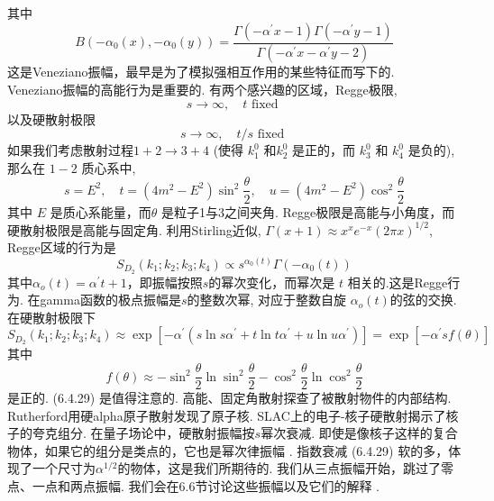 其中
\begin{equation}
	B\left(-\alpha_{0}(x),-\alpha_{0}(y)\right)=\frac{\Gamma\left(-\alpha^{\prime} x-1\right) \Gamma\left(-\alpha^{\prime} y-1\right)}{\Gamma\left(-\alpha^{\prime} x-\alpha^{\prime} y-2\right)}
\end{equation}
这是Veneziano振幅，最早是为了模拟强相互作用的某些特征而写下的.\\
Veneziano振幅的高能行为是重要的. 有两个感兴趣的区域，Regge极限,
\begin{equation}
	s \rightarrow \infty, \quad t \text { fixed }
\end{equation}
以及硬散射极限
\begin{equation}
	s \rightarrow \infty, \quad t / s \text { fixed }
\end{equation}
如果我们考虑散射过程$1+2 \rightarrow 3+4$ (使得 $k_{1}^{0}$ 和$k_{2}^{0}$ 是正的，而 $k_{3}^{0}$ 和 $k_{4}^{0}$ 是负的), 那么在 $1-2$ 质心系中,
\begin{equation}
	s=E^{2}, \quad t=\left(4 m^{2}-E^{2}\right) \sin ^{2} \frac{\theta}{2}, \quad u=\left(4 m^{2}-E^{2}\right) \cos ^{2} \frac{\theta}{2}
\end{equation}
其中 $E$ 是质心系能量，而$\theta$ 是粒子1与3之间夹角. Regge极限是高能与小角度，而硬散射极限是高能与固定角. 利用Stirling近似, $\Gamma(x+1) \approx x^{x} e^{-x}(2 \pi x)^{1 / 2}$, Regge区域的行为是
\begin{equation}
	S_{D_{2}}\left(k_{1} ; k_{2} ; k_{3} ; k_{4}\right) \propto s^{\alpha_{0}(t)} \Gamma\left(-\alpha_{0}(t)\right)
\end{equation}
其中$\alpha_{o}(t)=\alpha^{\prime} t+1 $，即振幅按照$s$的幂次变化，而幂次是 $t$ 相关的.这是Regge行为. 在gamma函数的极点振幅是$s$的整数次幂, 对应于整数自旋 $\alpha_{o}(t)$的弦的交换.\\
在硬散射极限下
\begin{equation}
	S_{D_{2}}\left(k_{1} ; k_{2} ; k_{3} ; k_{4}\right) \approx \exp \left[-\alpha^{\prime}\left(s \ln s \alpha^{\prime}+t \ln t \alpha^{\prime}+u \ln u \alpha^{\prime}\right)\right]=\exp \left[-\alpha^{\prime} s f(\theta)\right]
\end{equation}
其中
\begin{equation}
	f(\theta) \approx-\sin ^{2} \frac{\theta}{2} \ln \sin ^{2} \frac{\theta}{2}-\cos ^{2} \frac{\theta}{2} \ln \cos ^{2} \frac{\theta}{2}
\end{equation}
是正的.  (6.4.29) 是值得注意的. 高能、固定角散射探查了被散射物件的内部结构. Rutherford用硬alpha原子散射发现了原子核.  SLAC上的电子-核子硬散射揭示了核子的夸克组分. 在量子场论中，硬散射振幅按$s $幂次衰减. 即使是像核子这样的复合物体，如果它的组分是类点的，它也是幂次律振幅 . 指数衰减 (6.4.29) 软的多，体现了一个尺寸为$\alpha^{1 / 2}$的物体，这是我们所期待的. 我们从三点振幅开始，跳过了零点、一点和两点振幅. 我们会在6.6节讨论这些振幅以及它们的解释 .

